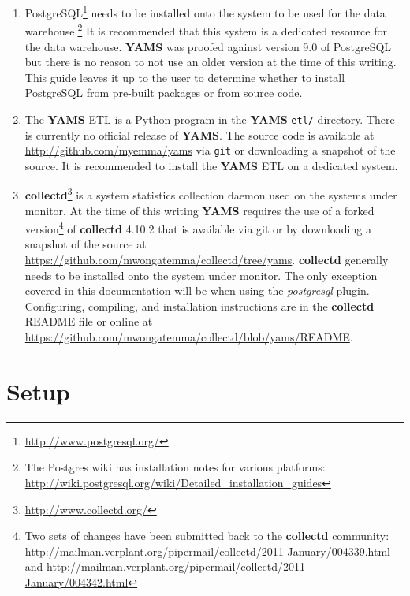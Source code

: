 \documentclass[a4paper,twoside,12pt]{article}
\begin{document}
\begin{enumerate}
  \item PostgreSQL\footnote{\url{http://www.postgresql.org/}} needs to be
        installed onto the system to be used for the data
        warehouse.\footnote{The Postgres wiki has installation notes for
        various platforms:
        \url{http://wiki.postgresql.org/wiki/Detailed_installation_guides}} It
        is recommended that this system is a dedicated resource for the data
        warehouse.  \textbf{YAMS} was proofed against version 9.0 of PostgreSQL
        but there is no reason to not use an older version at the time of this
        writing.  This guide leaves it up to the user to determine whether to
        install PostgreSQL from pre-built packages or from source code.
  \item The \textbf{YAMS} ETL is a Python program in the \textbf{YAMS}
        \texttt{etl/} directory.  There is currently no official release of
        \textbf{YAMS}.  The source code is available at
        \url{http://github.com/myemma/yams} via \texttt{git} or downloading a
        snapshot of the source.  It is recommended to install the \textbf{YAMS}
        ETL on a dedicated system.
  \item \textbf{collectd}\footnote{\url{http://www.collectd.org/}} is a system
        statistics collection daemon used on the systems under monitor.  At the
        time of this writing \textbf{YAMS} requires the use of a forked
        version\footnote{Two sets of changes have been submitted back to the
        \textbf{collectd} community:
        \url{http://mailman.verplant.org/pipermail/collectd/2011-January/004339.html}
        and
        \url{http://mailman.verplant.org/pipermail/collectd/2011-January/004342.html}}
        of \textbf{collectd} 4.10.2 that is available via git or by downloading
        a snapshot of the source at
        \url{https://github.com/mwongatemma/collectd/tree/yams}.
        \textbf{collectd} generally needs to be installed onto the system under
        monitor.  The only exception covered in this documentation will be when
        using the \textit{postgresql} plugin.  Configuring, compiling, and
        installation instructions are in the \textbf{collectd} README file or
        online at
        \url{https://github.com/mwongatemma/collectd/blob/yams/README}.

\end{enumerate}

\section{Setup}
\end{document}
